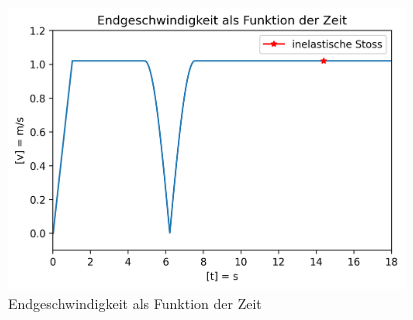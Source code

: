 \documentclass[../main.tex]{subfiles}
\begin{document}
    \begin{figure}[H]
        \begin{center}
            \centerline{\includegraphics[width=105mm]{./images/Inelastisch/Endgeschwindigkeit}}
            \caption{Endgeschwindigkeit als Funktion der Zeit}
            \label{fig:Endgeschwindigkeit}
        \end{center}
    \end{figure}
\end{document}
